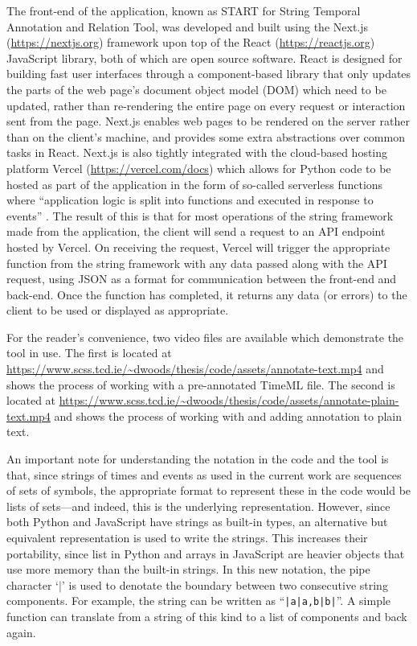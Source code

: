 \documentclass[a4paper,12pt,leqno]{article}
\newcommand{\vph}[1]{\vphantom{#1}}
\newcommand{\ebox}[1]{\fbox{$\vph{'(),}#1$}}
\newcommand{\EventString}[1]{%
	\renewcommand*{\do}[1]{\ebox{##1}}%
	\PipeParser{#1}%
}
\begin{document}
The front-end of the application, known as START for String Temporal Annotation and Relation Tool, was developed and built using the Next.js (\url{https://nextjs.org}) framework upon top of the React (\url{https://reactjs.org}) JavaScript library, both of which are open source software. React is designed for building fast user interfaces through a component-based library that only updates the parts of the web page's document object model (DOM) which need to be updated, rather than re-rendering the entire page on every request or interaction sent from the page. Next.js enables web pages to be rendered on the server rather than on the client's machine, and provides some extra abstractions over common tasks in React. Next.js is also tightly integrated with the cloud-based hosting platform Vercel (\url{https://vercel.com/docs}) which allows for Python code to be hosted as part of the application in the form of so-called serverless functions \citep{anderson1995serverless} where ``application logic is split into functions and executed in response to events'' \citep[p. 405]{mcgrath2017serverless}. The result of this is that for most operations of the string framework made from the application, the client will send a request to an API endpoint hosted by Vercel. On receiving the request, Vercel will trigger the appropriate function from the string framework with any data passed along with the API request, using JSON as a format for communication between the front-end and back-end. Once the function has completed, it returns any data (or errors) to the client to be used or displayed as appropriate.

For the reader's convenience, two video files are available which demonstrate the tool in use. The first is located at \url{https://www.scss.tcd.ie/~dwoods/thesis/code/assets/annotate-text.mp4} and shows the process of working with a pre-annotated TimeML file. The second is located at \url{https://www.scss.tcd.ie/~dwoods/thesis/code/assets/annotate-plain-text.mp4} and shows the process of working with and adding annotation to plain text.

An important note for understanding the notation in the code and the tool is that, since strings of times and events as used in the current work are sequences of sets of symbols, the appropriate format to represent these in the code would be lists of sets---and indeed, this is the underlying representation. However, since both Python and JavaScript have strings as built-in types, an alternative but equivalent representation is used to write the strings. This increases their portability, since list in Python and arrays in JavaScript are heavier objects that use more memory than the built-in strings. In this new notation, the pipe character `$|$' is used to denotate the boundary between two consecutive string components. For example, the string \EventString{{}|a|a,b|b|{}} can be written as ``\verb!|a|a,b|b|!''. A simple function can translate from a string of this kind to a list of components and back again.
\end{document}
